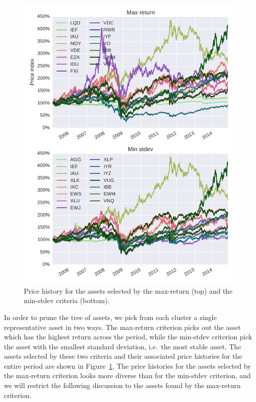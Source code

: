 \begin{figure}[tp]
\centering
\includegraphics[width=1.0\textwidth]{../pic/prices_selected_assets.pdf}
\caption{Price history for the assets selected by the max-return (top) and the min-stdev criteria (bottom).}
\label{fig:prices_selected}
\end{figure}

In order to prune the tree of assets, we pick from each cluster a single representative asset in two ways.
The max-return criterion picks out the asset which has the highest return across the period, while the min-stdev criterion pick the asset with the smallest standard deviation, i.e.\ the most stable asset.
The assets selected by these two criteria and their associated price histories for the entire period are shown in Figure~\ref{fig:prices_selected}.
The price histories for the assets selected by the max-return criterion looks more diverse than for the min-stdev criterion, and we will restrict the following discussion to the assets found by the max-return criterion.